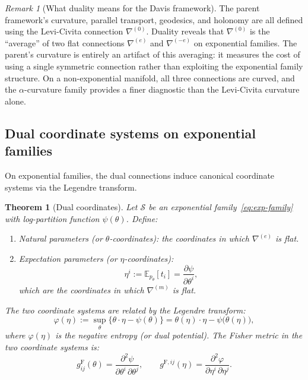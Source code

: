 \documentclass[11pt]{article}
\newcommand{\E}{\mathbb{E}}
\newcommand{\gF}{g^{\mathrm{F}}}
\newtheorem{theorem}{Theorem}
\theoremstyle{remark}
\newtheorem{remark}{Remark}
\begin{document}
\begin{remark}[What duality means for the Davis framework]
\label{rmk:duality-davis}
The parent framework's curvature, parallel transport, geodesics, and holonomy
are all defined using the Levi-Civita connection $\nabla^{(0)}$.  Duality
reveals that $\nabla^{(0)}$ is the ``average'' of two flat connections
$\nabla^{(e)}$ and $\nabla^{(-e)}$ on exponential families.  The parent's
curvature is entirely an artifact of this averaging: it measures the cost of
using a single symmetric connection rather than exploiting the exponential
family structure.  On a non-exponential manifold, all three connections are
curved, and the $\alpha$-curvature family provides a finer diagnostic than the
Levi-Civita curvature alone.
\end{remark}

\subsection{Dual coordinate systems on exponential families}

On exponential families, the dual connections induce canonical coordinate
systems via the Legendre transform.

\begin{theorem}[Dual coordinates]\label{thm:dual-coordinates}
Let $\mathcal{S}$ be an exponential family~\eqref{eq:exp-family} with
log-partition function $\psi(\theta)$.  Define:
\begin{enumerate}[label=\textnormal{(\roman*)}, leftmargin=*]
  \item \emph{Natural parameters} (or $\theta$-coordinates):
  the coordinates in which $\nabla^{(e)}$ is flat.
  \item \emph{Expectation parameters} (or $\eta$-coordinates):
  \begin{equation}\label{eq:eta-coords}
  \eta^i := \E_{p_\theta}[t_i]
  = \frac{\partial \psi}{\partial \theta^i},
  \end{equation}
  which are the coordinates in which $\nabla^{(m)}$ is flat.
\end{enumerate}
The two coordinate systems are related by the Legendre transform:
\begin{equation}\label{eq:legendre}
\varphi(\eta) := \sup_\theta\!\bigl\{\theta \cdot \eta - \psi(\theta)\bigr\}
= \theta(\eta) \cdot \eta - \psi\bigl(\theta(\eta)\bigr),
\end{equation}
where $\varphi(\eta)$ is the negative entropy (or dual potential).  The
Fisher metric in the two coordinate systems is:
\begin{equation}\label{eq:fisher-dual}
\gF_{ij}(\theta) = \frac{\partial^2 \psi}{\partial\theta^i\, \partial\theta^j},
\qquad
g^{\mathrm{F},ij}(\eta) = \frac{\partial^2 \varphi}{\partial\eta^i\, \partial\eta^j}.
\end{equation}
\end{theorem}
\end{document}
